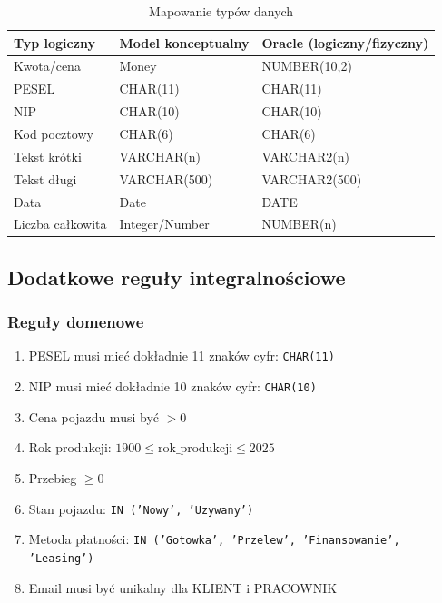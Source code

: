 \documentclass[a4paper,titleauthor]{mwart}
\begin{document}
	\begin{table}[H]
		\centering
		\begin{tabular}{|l|l|l|}
			\hline
			\textbf{Typ logiczny} & \textbf{Model konceptualny} & \textbf{Oracle (logiczny/fizyczny)} \\
			\hline
			Kwota/cena & Money & NUMBER(10,2) \\
			\hline
			PESEL & CHAR(11) & CHAR(11) \\
			\hline
			NIP & CHAR(10) & CHAR(10) \\
			\hline
			Kod pocztowy & CHAR(6) & CHAR(6) \\
			\hline
			Tekst krótki & VARCHAR(n) & VARCHAR2(n) \\
			\hline
			Tekst długi & VARCHAR(500) & VARCHAR2(500) \\
			\hline
			Data & Date & DATE \\
			\hline
			Liczba całkowita & Integer/Number & NUMBER(n) \\
			\hline
		\end{tabular}
		\caption{Mapowanie typów danych}
	\end{table}
	
	\subsection{Dodatkowe reguły integralnościowe}
	
	\subsubsection{Reguły domenowe}
	
	\begin{enumerate}
		\item PESEL musi mieć dokładnie 11 znaków cyfr: \texttt{CHAR(11)}
		\item NIP musi mieć dokładnie 10 znaków cyfr: \texttt{CHAR(10)}
		\item Cena pojazdu musi być $> 0$
		\item Rok produkcji: $1900 \leq \text{rok\_produkcji} \leq 2025$
		\item Przebieg $\geq 0$
		\item Stan pojazdu: \texttt{IN ('Nowy', 'Uzywany')}
		\item Metoda płatności: \texttt{IN ('Gotowka', 'Przelew', 'Finansowanie', 'Leasing')}
		\item Email musi być unikalny dla KLIENT i PRACOWNIK
	\end{enumerate}
	
\end{document}

